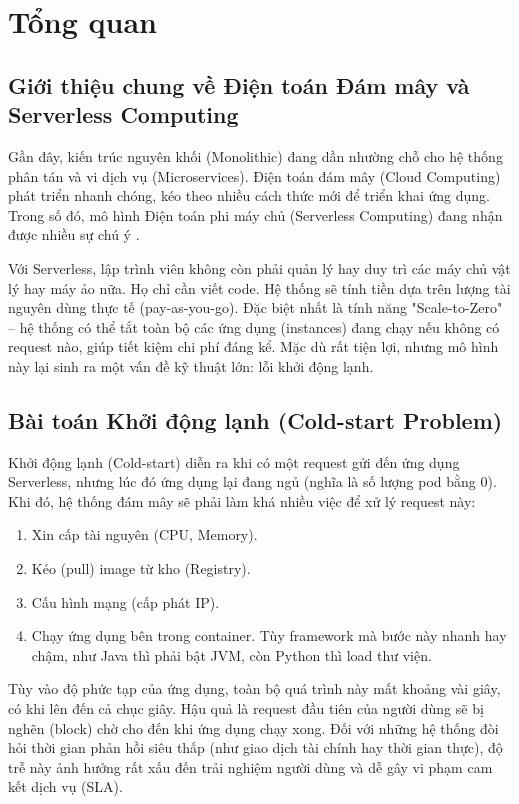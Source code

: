 \section{Tổng quan}

\subsection{Giới thiệu chung về Điện toán Đám mây và Serverless Computing}
Gần đây, kiến trúc nguyên khối (Monolithic) đang dần nhường chỗ cho hệ thống phân tán và vi dịch vụ (Microservices). Điện toán đám mây (Cloud Computing) phát triển nhanh chóng, kéo theo nhiều cách thức mới để triển khai ứng dụng. Trong số đó, mô hình Điện toán phi máy chủ (Serverless Computing) đang nhận được nhiều sự chú ý \cite{shahrad2020serverless, hellerstein2018serverless}.

Với Serverless, lập trình viên không còn phải quản lý hay duy trì các máy chủ vật lý hay máy ảo nữa. Họ chỉ cần viết code. Hệ thống sẽ tính tiền dựa trên lượng tài nguyên dùng thực tế (pay-as-you-go). Đặc biệt nhất là tính năng "Scale-to-Zero" – hệ thống có thể tắt toàn bộ các ứng dụng (instances) đang chạy nếu không có request nào, giúp tiết kiệm chi phí đáng kể. Mặc dù rất tiện lợi, nhưng mô hình này lại sinh ra một vấn đề kỹ thuật lớn: lỗi khởi động lạnh.

\subsection{Bài toán Khởi động lạnh (Cold-start Problem)}
Khởi động lạnh (Cold-start) diễn ra khi có một request gửi đến ứng dụng Serverless, nhưng lúc đó ứng dụng lại đang ngủ (nghĩa là số lượng pod bằng 0). Khi đó, hệ thống đám mây sẽ phải làm khá nhiều việc để xử lý request này:
\begin{enumerate}
    \item Xin cấp tài nguyên (CPU, Memory).
    \item Kéo (pull) image từ kho (Registry).
    \item Cấu hình mạng (cấp phát IP).
    \item Chạy ứng dụng bên trong container. Tùy framework mà bước này nhanh hay chậm, như Java thì phải bật JVM, còn Python thì load thư viện.
\end{enumerate}

Tùy vào độ phức tạp của ứng dụng, toàn bộ quá trình này mất khoảng vài giây, có khi lên đến cả chục giây. Hậu quả là request đầu tiên của người dùng sẽ bị nghẽn (block) chờ cho đến khi ứng dụng chạy xong. Đối với những hệ thống đòi hỏi thời gian phản hồi siêu thấp (như giao dịch tài chính hay thời gian thực), độ trễ này ảnh hưởng rất xấu đến trải nghiệm người dùng và dễ gây vi phạm cam kết dịch vụ (SLA).

